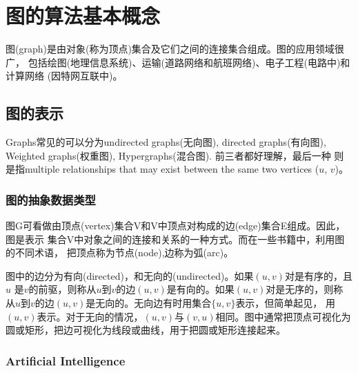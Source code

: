 


\chapter{图的算法基本概念}
\label{chap:graph-primer}

图(graph)是由对象(称为顶点)集合及它们之间的连接集合组成。图的应用领域很广，
包括绘图(地理信息系统)、运输(道路网络和航班网络)、电子工程(电路中)和计算网络
(因特网互联中)。


% 
% 
\section{图的表示}
\label{intro:sec:graph:presentation}

Graphs常见的可以分为undirected graphs(无向图), directed graphs(有向图),
Weighted graphs(权重图), Hypergraphs(混合图). 前三者都好理解，最后一种
则是指multiple relationships that may exist between the same two vertices
($u$, $v$)。

\subsection{图的抽象数据类型}
图G可看做由顶点(vertex)集合V和V中顶点对构成的边(edge)集合E组成。因此，图是表示
集合V中对象之间的连接和关系的一种方式。而在一些书籍中，利用图的不同术语，
把顶点称为节点(node),边称为弧(arc)。

图中的边分为有向(directed)，和无向的(undirected)。如果$(u,v)$对是有序的，且$u$
是$v$的前驱，则称从$u$到$v$的边$(u,v)$是有向的。如果$(u,v)$对是无序的，则称
从$u$到$v$的边$(u,v)$是无向的。无向边有时用集合$\{u,v\}$表示，但简单起见，
用$(u,v)$表示。对于无向的情况，$(u,v)$与$(v,u)$相同。图中通常把顶点可视化为
圆或矩形，把边可视化为线段或曲线，用于把圆或矩形连接起来。

% 
% 
\subsection{Artificial Intelligence}
\label{sec:artificial_intelligence}



